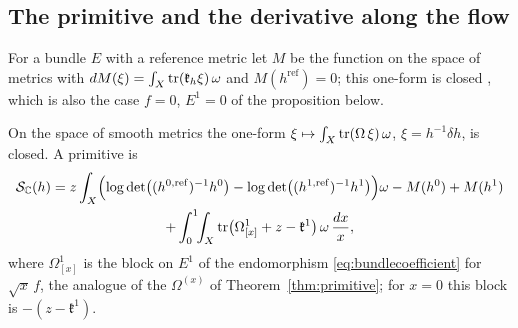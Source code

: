 \subsection{The primitive and the derivative along the flow}
For a bundle $E$ with a reference metric let $M$ be the function on the
space of metrics with $dM(\xi)=\int_X\operatorname{tr}(\mathfrak k_h\xi)\,\omega$ and
$M(h^{\mathrm{ref}})=0$; this one-form is closed \cite{don85}, which is also
the case $f=0$, $E^1=0$ of the proposition below.

\begin{proposition}\label{prop:bundleprimitive}
On the space of smooth metrics the one-form
$\xi\mapsto\int_X\operatorname{tr}(\Omega\,\xi)\,\omega$, $\xi=h^{-1}\delta h$, is closed. A
primitive is
\begin{multline*}
 \mathcal S_{\mathbb C}(h)=z\int_X\Bigl(\log\det\bigl((h^{0,\mathrm{ref}})^{-1}h^0\bigr)
 -\log\det\bigl((h^{1,\mathrm{ref}})^{-1}h^1\bigr)\Bigr)\omega
 -M(h^0)+M(h^1)\\
 +\int_0^1\!\!\int_X\operatorname{tr}\bigl(\Omega_{[x]}^1+z-\mathfrak k^1\bigr)\,\omega\,\frac{dx}x,
\end{multline*}
where $\Omega_{[x]}^1$ is the block on $E^1$ of the endomorphism
\eqref{eq:bundlecoefficient} for $\sqrt x\,f$, the analogue of the
$\Omega^{(x)}$ of Theorem~\ref{thm:primitive}; for $x=0$ this block is
$-(z-\mathfrak k^1)$.
\end{proposition}

